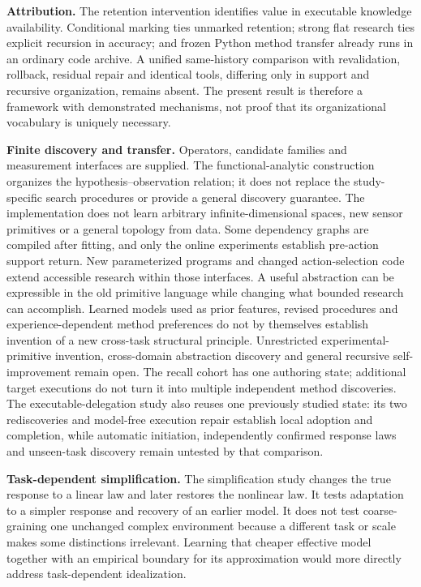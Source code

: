 \documentclass[twoside,11pt]{article}
\begin{document}
\textbf{Attribution.} The retention intervention identifies value in executable knowledge availability. Conditional marking ties unmarked retention; strong flat research ties explicit recursion in accuracy; and frozen Python method transfer already runs in an ordinary code archive. A unified same-history comparison with revalidation, rollback, residual repair and identical tools, differing only in support and recursive organization, remains absent. The present result is therefore a framework with demonstrated mechanisms, not proof that its organizational vocabulary is uniquely necessary.


\textbf{Finite discovery and transfer.} Operators, candidate families and measurement interfaces are supplied. The functional-analytic construction organizes the hypothesis–observation relation; it does not replace the study-specific search procedures or provide a general discovery guarantee. The implementation does not learn arbitrary infinite-dimensional spaces, new sensor primitives or a general topology from data. Some dependency graphs are compiled after fitting, and only the online experiments establish pre-action support return. New parameterized programs and changed action-selection code extend accessible research within those interfaces. A useful abstraction can be expressible in the old primitive language while changing what bounded research can accomplish. Learned models used as prior features, revised procedures and experience-dependent method preferences do not by themselves establish invention of a new cross-task structural principle. Unrestricted experimental-primitive invention, cross-domain abstraction discovery and general recursive self-improvement remain open. The recall cohort has one authoring state; additional target executions do not turn it into multiple independent method discoveries. The executable-delegation study also reuses one previously studied state: its two rediscoveries and model-free execution repair establish local adoption and completion, while automatic initiation, independently confirmed response laws and unseen-task discovery remain untested by that comparison.


\textbf{Task-dependent simplification.} The simplification study changes the true response to a linear law and later restores the nonlinear law. It tests adaptation to a simpler response and recovery of an earlier model. It does not test coarse-graining one unchanged complex environment because a different task or scale makes some distinctions irrelevant. Learning that cheaper effective model together with an empirical boundary for its approximation would more directly address task-dependent idealization.
\end{document}
